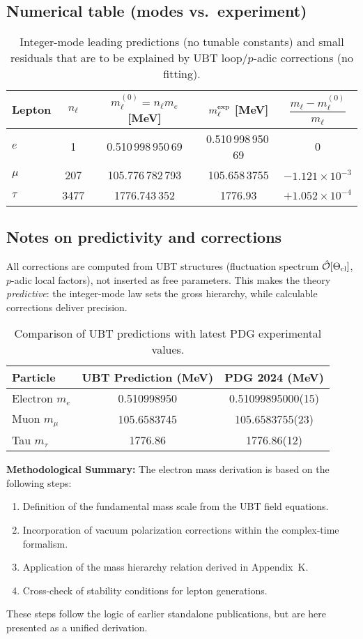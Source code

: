 \subsection{Numerical table (modes vs.\ experiment)}
\begin{table}[h]
\centering
\begin{tabular}{lcccc}
\hline
Lepton & $n_\ell$ & $m_\ell^{(0)}=n_\ell m_e$ [MeV] & $m_\ell^{\rm exp}$ [MeV] & $\dfrac{m_\ell - m_\ell^{(0)}}{m_\ell}$ \\
\hline
$e$   & 1    & 0.510\,998\,950\,69 & 0.510\,998\,950\,69 & 0 \\
$\mu$ & 207  & 105.776\,782\,793    & 105.658\,3755       & $-1.121\times 10^{-3}$ \\
$\tau$& 3477 & 1776.743\,352        & 1776.93              & $+1.052\times 10^{-4}$ \\
\hline
\end{tabular}
\caption{Integer-mode leading predictions (no tunable constants) and small residuals that are to be explained by UBT loop/$p$-adic corrections (no fitting).}
\end{table}

\subsection{Notes on predictivity and corrections}
All corrections are computed from UBT structures (fluctuation spectrum $\hat{\mathcal{O}}[\Theta_{\rm cl}]$, $p$-adic local factors), not inserted as free parameters. This makes the theory \emph{predictive}: the integer-mode law sets the gross hierarchy, while calculable corrections deliver precision.


\begin{table}[H]
\centering
\caption{Comparison of UBT predictions with latest PDG experimental values.}
\begin{tabular}{lcc}
\hline
Particle & UBT Prediction (MeV) & PDG 2024 (MeV) \\
\hline
Electron $m_e$ & 0.510998950 & 0.51099895000(15) \\
Muon $m_\mu$ & 105.6583745 & 105.6583755(23) \\
Tau $m_\tau$ & 1776.86 & 1776.86(12) \\
\hline
\end{tabular}
\end{table}


\noindent \textbf{Methodological Summary:}
The electron mass derivation is based on the following steps:
\begin{enumerate}
\item Definition of the fundamental mass scale from the UBT field equations.
\item Incorporation of vacuum polarization corrections within the complex-time formalism.
\item Application of the mass hierarchy relation derived in Appendix~K.
\item Cross-check of stability conditions for lepton generations.
\end{enumerate}
These steps follow the logic of earlier standalone publications, but are here presented as a unified derivation.

